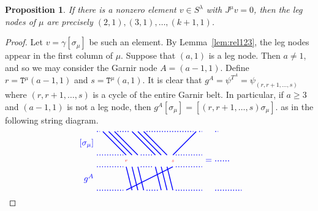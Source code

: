 \documentclass[twoside,11pt,reqno,letter]{amsart}
\numberwithin{equation}{section}
\newtheorem{Proposition}[equation]{Proposition}
\theoremstyle{definition}  %
\newcommand{\0}{{\bar 0}}
\newcommand{\1}{{\bar 1}}
\newcommand{\ga}{\gamma}
\newcommand{\la}{\lambda}
\newcommand{\si}{\sigma}
\def\T{{\mathtt T}}
\newenvironment{braid}{%
  \begin{tikzpicture}[baseline=6mm,blue,line width=1pt, scale=0.4,
                      draw/.append style={rounded corners},
                      every node/.append style={font=\tiny}]%
  }{\end{tikzpicture}
}
\begin{document}
{\begin{Proposition}\label{prop:legNodes}
  If there is a nonzero element $v \in S^\la$ with $J^\mu v = 0$, then the leg nodes of $\mu$ are precisely $(2,1), (3,1), \dots, (k + 1,1)$.
\end{Proposition}

\begin{proof}
  Let $v = \ga [\si_{\mu}]$ be such an element. By Lemma~\ref{lem:rel123}, the leg nodes appear in the first column of $\mu$. Suppose that $(a, 1)$ is a leg node. Then $a \neq 1$, and so we may consider the Garnir node $A = (a-1, 1)$. Define $r = \T^\mu(a-1,1)$ and $s = \T^\mu(a,1)$. It is clear that $g^A = \psi^{T^A} = \psi_{(r, r+1, \dots, s)}$ where $(r, r+1, \dots, s)$ is a cycle of the entire Garnir belt. In particular, if $a \geq 3$ and $(a-1,1)$ is not a leg node, then $g^A [\si_{\mu}] = [(r, r+1, \dots, s)\si_{\mu}]$.
\iffalse
as in the following string diagram.
\[
  \begin{braid}\tikzset{scale=0.6,baseline=12mm}
    \draw(0,8)node[left,font=\normalsize]{$[\si_{\mu}]$};
    \draw(0,2)node[left,font=\normalsize]{$g^A$};

    \draw[dotted](0,10)--(0.5,10);
    \draw[dotted](0,6)--(4.5,6);
    \draw[dotted](0,4)--(4.5,4);
    \draw[dotted](0,0)--(4.5,0);

    \draw(1,10)--(5,6); \draw(5,5)node[color=red]{$r$}; \draw(5,4)--(6,0);
    \draw(2,10)--(6,6); \draw(6,4)--(7,0);
    \draw(3,10)--(7,6); \draw(7,4)--(8,0);

    \draw[dotted](3.5,10)--(5.5,10);
    \draw[dotted](7.5,6)--(9.5,6);
    \draw[dotted](7.5,4)--(9.5,4);
    \draw[dotted](8.5,0)--(10.5,0);

    \draw(6,10)--(10,6); \draw(10,4)--(11,0);
    \draw(7,10)--(11,6); \draw(11,4)--(12,0);
    \draw(8,10)--(12,6); \draw(12,4)--(13,0);

    \draw[dotted](8.5,10)--(16.5,10);

    \draw(17,10)--(13,6); \draw(13,5)node[color=red]{$s$}; \draw(13,4)--(5,0);

    \draw[dotted](17.5,10)--(18,10);
    \draw[dotted](13.5,6)--(18,6);
    \draw[dotted](13.5,4)--(18,4);
    \draw[dotted](13.5,0)--(18,0);
  \end{braid}
  \begin{braid}\tikzset{scale=0.6,baseline=12mm}
    \draw(0,5)node[font=\normalsize]{$=$};
  \end{braid}
  \begin{braid}\tikzset{scale=0.6,baseline=12mm}
    \draw[dotted](0,10)--(0.5,10);
    \draw[dotted](0,5)--(2.5,5);
    \draw[dotted](0,0)--(4.5,0);


\end{braid}\]
\end{proof}}
\end{document}
